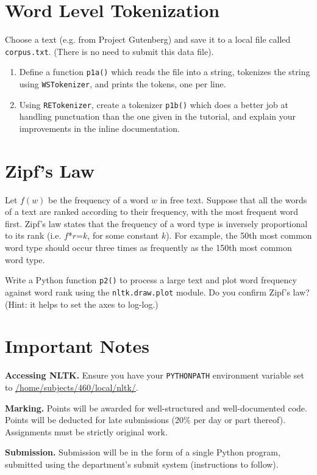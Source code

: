 \documentclass[a4paper,12pt]{460}
\begin{document}
\pagebreak

\section{Word Level Tokenization}

Choose a text (e.g. from Project Gutenberg)
and save it to a local file called \texttt{corpus.txt}.  (There is no need
to submit this data file).

\begin{enumerate}
    \item Define a function \texttt{p1a()} which reads the file into a
      string, tokenizes the string using \texttt{WSTokenizer},
      and prints the tokens, one per line.
    \item Using \texttt{RETokenizer}, create a tokenizer \texttt{p1b()}
      which does a better
      job at handling punctuation than the one given in the tutorial, and
      explain your improvements in the inline documentation.
\end{enumerate}

\section{Zipf's Law}

Let $f(w)$ be the frequency of a word $w$ in free text.  Suppose that
all the words of a text are ranked according to their frequency, with
the most frequent word first.
Zipf's law states that the frequency of a word type is inversely
proportional to its rank (i.e. $f$*$r$=$k$, for some constant $k$).
For example, the 50th most common word type should
occur three times as frequently as the 150th most common word type.

Write a Python function \texttt{p2()}
to process a large text and plot word frequency
against word rank using the \texttt{nltk.draw.plot} module.
Do you confirm Zipf's law?  (Hint: it helps to
set the axes to log-log.)

\section*{Important Notes}

{\bf Accessing NLTK.}
Ensure you have your \texttt{PYTHONPATH} environment variable
set to \url{/home/subjects/460/local/nltk/}.

{\bf Marking.}  Points will be awarded for well-structured and
well-documented code.  Points will be deducted for late submissions
(20\% per day or part thereof).  Assignments must be strictly original
work.

{\bf Submission.}
Submission will be in the form of a single Python program,
submitted using the department's submit system
(instructions to follow).
\end{document}
